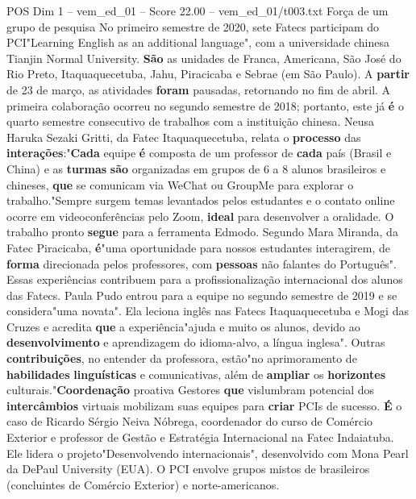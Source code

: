 \begin{textsample}{POS Dim 1 – vem\_ed\_01 – Score 22.00 – vem\_ed\_01/t003.txt}  \label{ex:f1_pos_093}
Força de um grupo de pesquisa No primeiro semestre de 2020, sete Fatecs participam do PCI"Learning English as an additional language", com a universidade chinesa Tianjin Normal University. \textbf{São} as unidades de Franca, Americana, São José do Rio Preto, Itaquaquecetuba, Jahu, Piracicaba e Sebrae (em São Paulo).
A \textbf{partir} de 23 de março, as atividades \textbf{foram} pausadas, retornando no fim de abril.
A primeira colaboração ocorreu no segundo semestre de 2018; portanto, este já \textbf{é} o quarto semestre consecutivo de trabalhos com a instituição chinesa.
Neusa Haruka Sezaki Gritti, da Fatec Itaquaquecetuba, relata o \textbf{processo} das \textbf{interações}:"\textbf{Cada} equipe \textbf{é} composta de um professor de \textbf{cada} país (Brasil e China) e as \textbf{turmas} \textbf{são} organizadas em grupos de 6 a 8 alunos brasileiros e chineses, \textbf{que} se comunicam via WeChat ou GroupMe para explorar o trabalho."Sempre surgem temas levantados pelos estudantes e o contato online ocorre em videoconferências pelo Zoom, \textbf{ideal} para desenvolver a oralidade.
O trabalho pronto \textbf{segue} para a ferramenta Edmodo.
Segundo Mara Miranda, da Fatec Piracicaba, \textbf{é}"uma oportunidade para nossos estudantes interagirem, de \textbf{forma} direcionada pelos professores, com \textbf{pessoas} não falantes do Português".
Essas experiências contribuem para a profissionalização internacional dos alunos das Fatecs.
Paula Pudo entrou para a equipe no segundo semestre de 2019 e se considera"uma novata".
Ela leciona inglês nas Fatecs Itaquaquecetuba e Mogi das Cruzes e acredita \textbf{que} a experiência"ajuda e muito os alunos, devido ao \textbf{desenvolvimento} e aprendizagem do idioma-alvo, a língua inglesa".
Outras \textbf{contribuições}, no entender da professora, estão"no aprimoramento de \textbf{habilidades} \textbf{linguísticas} e comunicativas, além de \textbf{ampliar} os \textbf{horizontes} culturais."\textbf{Coordenação} proativa Gestores \textbf{que} vislumbram potencial dos \textbf{intercâmbios} virtuais mobilizam suas equipes para \textbf{criar} PCIs de sucesso. \textbf{É} o caso de Ricardo Sérgio Neiva Nóbrega, coordenador do curso de Comércio Exterior e professor de Gestão e Estratégia Internacional na Fatec Indaiatuba.
Ele lidera o projeto"Desenvolvendo internacionais", desenvolvido com Mona Pearl da DePaul University (EUA).
O PCI envolve grupos mistos de brasileiros (concluintes de Comércio Exterior) e norte-americanos.

\end{textsample}
